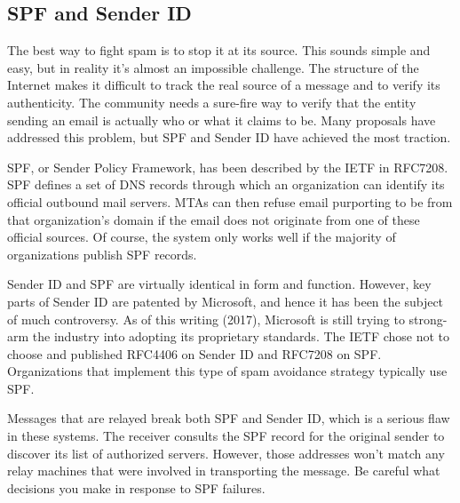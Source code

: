 \protect\hypertarget{part0026_split_015.html}{}{}

\hypertarget{part0026_split_015.htmlux5cux23_idContainer1247}{}
\hypertarget{part0026_split_015.htmlux5cux23calibre_pb_14}{%
\subsection[SPF and Sender
ID]{\texorpdfstring{\protect\hypertarget{part0026_split_015.htmlux5cux23_idTextAnchor1022}{}{}\protect\hypertarget{part0026_split_015.htmlux5cux23_idTextAnchor1023}{}{}\protect\hypertarget{part0026_split_015.htmlux5cux23_idTextAnchor1024}{}{}SPF
and Sender
ID}{SPF and Sender ID}}\label{part0026_split_015.htmlux5cux23calibre_pb_14}}

\protect\hypertarget{part0026_split_015.htmlux5cux23_idIndexMarker2448}{}{}\protect\hypertarget{part0026_split_015.htmlux5cux23_idIndexMarker2449}{}{}\protect\hypertarget{part0026_split_015.htmlux5cux23_idIndexMarker2450}{}{}\protect\hypertarget{part0026_split_015.htmlux5cux23_idIndexMarker2451}{}{}The
best way to fight spam is to stop it at its source. This sounds simple
and easy, but in reality it's almost an impossible challenge. The
structure of the Internet makes it difficult to track the real source of
a message and to verify its authenticity. The community needs a
sure-fire way to verify that the entity sending an email is actually who
or what it claims to be. Many proposals have addressed this problem, but
SPF and Sender ID have achieved the most traction.

SPF, or Sender Policy Framework, has been described by the IETF in
RFC7208. SPF defines a set of DNS records through which an organization
can identify its official outbound mail servers. MTAs can then refuse
email purporting to be from that organization's domain if the email does
not originate from one of these official sources. Of course, the system
only works well if the majority of organizations publish SPF records.

Sender ID and SPF are virtually identical in form and function. However,
key parts of Sender ID are patented by Microsoft, and hence it has been
the subject of much controversy. As of this writing (2017), Microsoft is
still trying to strong-arm the industry into adopting its proprietary
standards. The IETF chose not to choose and published RFC4406 on Sender
ID and RFC7208 on SPF. Organizations that implement this type of spam
avoidance strategy typically use SPF.

Messages that are relayed break both SPF and Sender ID, which is a
serious flaw in these systems. The receiver consults the SPF record for
the original sender to discover its list of authorized servers. However,
those addresses won't match any relay machines that were involved in
transporting the message. Be careful what decisions you make in response
to SPF failures.

